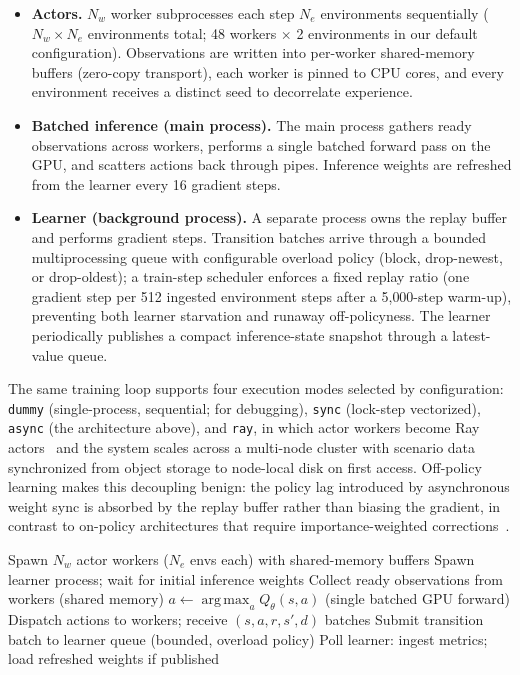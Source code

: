 \documentclass{article}
\DeclareMathOperator*{\argmax}{arg\,max}
\begin{document}
\begin{itemize}
  \item \textbf{Actors.} $N_w$ worker subprocesses each step $N_e$
  environments sequentially ($N_w \times N_e$ environments total; 48 workers
  $\times$ 2 environments in our default configuration). Observations are
  written into per-worker shared-memory buffers (zero-copy transport), each
  worker is pinned to CPU cores, and every environment receives a distinct
  seed to decorrelate experience.
  \item \textbf{Batched inference (main process).} The main process gathers
  ready observations across workers, performs a single batched forward pass
  on the GPU, and scatters actions back through pipes. Inference weights are
  refreshed from the learner every 16 gradient steps.
  \item \textbf{Learner (background process).} A separate process owns the
  replay buffer and performs gradient steps. Transition batches arrive
  through a bounded multiprocessing queue with configurable overload policy
  (block, drop-newest, or drop-oldest); a train-step scheduler enforces a
  fixed replay ratio (one gradient step per 512 ingested environment steps
  after a 5{,}000-step warm-up), preventing both learner starvation and
  runaway off-policyness. The learner periodically publishes a compact
  inference-state snapshot through a latest-value queue.
\end{itemize}

The same training loop supports four execution modes selected by
configuration: \texttt{dummy} (single-process, sequential; for debugging),
\texttt{sync} (lock-step vectorized), \texttt{async} (the architecture
above), and \texttt{ray}, in which actor workers become Ray
actors~\citep{moritz2018ray} and the system scales across a multi-node
cluster with scenario data synchronized from object storage to node-local
disk on first access. Off-policy learning makes this decoupling benign: the
policy lag introduced by asynchronous weight sync is absorbed by the replay
buffer rather than biasing the gradient, in contrast to on-policy
architectures that require importance-weighted
corrections~\citep{espeholt2018impala}.

\begin{algorithm}[t]
\caption{Asynchronous training loop (main process)}
\label{alg:async}
\begin{algorithmic}[1]
\STATE Spawn $N_w$ actor workers ($N_e$ envs each) with shared-memory buffers
\STATE Spawn learner process; wait for initial inference weights
  \STATE Collect ready observations from workers (shared memory)
  \STATE $a \leftarrow \argmax_a Q_\theta(s, a)$ \hfill (single batched GPU forward)
  \STATE Dispatch actions to workers; receive $(s, a, r, s', d)$ batches
  \STATE Submit transition batch to learner queue (bounded, overload policy)
  \STATE Poll learner: ingest metrics; load refreshed weights if published
\ENDWHILE
\end{algorithmic}
\end{algorithm}
\end{document}
